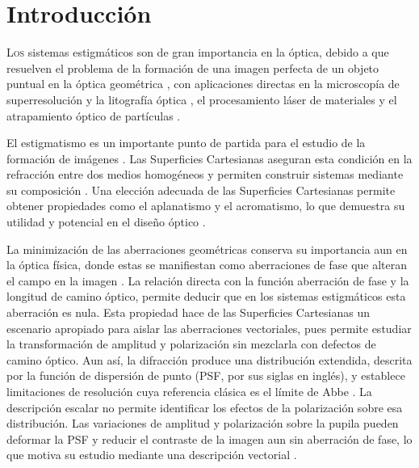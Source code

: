 \chapter*{Introducción}

\lettrine[lines=2]{L}{os} sistemas estigmáticos son de gran importancia en
la óptica, debido a que resuelven el problema de la formación de una imagen
perfecta de un objeto puntual en la óptica geométrica
\cite{bornwolf1999,Tyc2011Absolute}, con aplicaciones directas en la
microscopía de superresolución y la litografía óptica
\cite{Shen2022,flagello1996}, el procesamiento láser de materiales
\cite{Niziev1999Cutting} y el atrapamiento óptico de partículas
\cite{Kozawa2010Trapping}.

El estigmatismo es un importante punto de partida para el estudio
de la formación de imágenes \cite{singlet2020, bornwolf1999}. Las Superficies Cartesianas aseguran esta
condición en la refracción entre dos medios homogéneos y permiten construir
sistemas mediante su composición \cite{singlet2020,ovoids2023}. Una elección
adecuada de las Superficies Cartesianas permite obtener propiedades como el
aplanatismo y el acromatismo, lo que demuestra su utilidad y potencial en el
diseño óptico \cite{aplan2020,achro2022}.

La minimización de las aberraciones geométricas conserva su importancia aun
en la óptica física, donde estas se manifiestan como aberraciones de fase
que alteran el campo en la imagen \cite{bornwolf1999,goodman2005}. La relación directa con la función aberración de fase y la longitud de camino óptico, permite deducir que en los sistemas estigmáticos esta aberración es nula. Esta propiedad hace de las Superficies Cartesianas un
escenario apropiado para aislar las aberraciones vectoriales, pues permite
estudiar la transformación de amplitud y polarización sin mezclarla con
defectos de camino óptico. Aun así, la difracción produce una distribución
extendida,
descrita por la función de dispersión de punto (PSF, por sus siglas en inglés),
y establece limitaciones de resolución cuya referencia clásica es el límite
de Abbe \cite{Abbe1873,goodman2005}. La descripción escalar no permite
identificar los efectos de la polarización sobre esa distribución. Las
variaciones de amplitud y polarización sobre la pupila pueden deformar la
PSF y reducir el contraste de la imagen aun sin aberración de fase, lo que
motiva su estudio mediante una descripción vectorial
\cite{McGuire1991Response,mcguire1994,flagello1996}.


